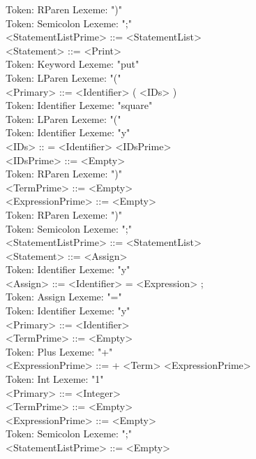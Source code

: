 \documentclass[11pt]{article}
\begin{document}
Token: RParen    Lexeme: ")" \\
Token: Semicolon         Lexeme: ";" \\
        <StatementListPrime> ::= <StatementList> \\
        <Statement> ::= <Print> \\
Token: Keyword   Lexeme: "put" \\
Token: LParen    Lexeme: "(" \\
        <Primary> ::= <Identifier> ( <IDs> ) \\
Token: Identifier        Lexeme: "square" \\
Token: LParen    Lexeme: "(" \\
Token: Identifier        Lexeme: "y" \\
        <IDs> :: = <Identifier> <IDsPrime> \\
        <IDsPrime> ::= <Empty> \\
Token: RParen    Lexeme: ")" \\
        <TermPrime> ::= <Empty> \\
        <ExpressionPrime> ::= <Empty> \\
Token: RParen    Lexeme: ")" \\
Token: Semicolon         Lexeme: ";" \\
        <StatementListPrime> ::= <StatementList> \\
        <Statement> ::= <Assign> \\
Token: Identifier        Lexeme: "y" \\
        <Assign> ::= <Identifier> = <Expression> ; \\
Token: Assign    Lexeme: "=" \\
Token: Identifier        Lexeme: "y" \\
        <Primary> ::= <Identifier> \\
        <TermPrime> ::= <Empty> \\
Token: Plus      Lexeme: "+" \\
        <ExpressionPrime> ::= + <Term> <ExpressionPrime> \\
Token: Int       Lexeme: "1" \\
        <Primary> ::= <Integer> \\
        <TermPrime> ::= <Empty> \\
        <ExpressionPrime> ::= <Empty> \\
Token: Semicolon         Lexeme: ";" \\
        <StatementListPrime> ::= <Empty> \\
\end{document}
